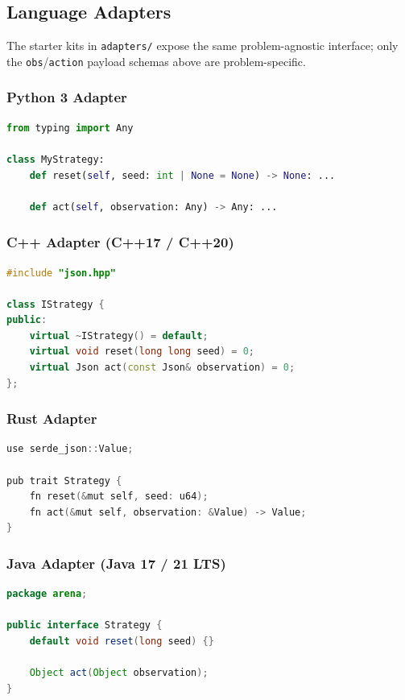 \documentclass[11pt,a4paper]{article}
\begin{document}
\subsection{Language Adapters}

The starter kits in \texttt{adapters/} expose the same problem-agnostic
interface; only the \texttt{obs}/\texttt{action} payload schemas above are
problem-specific.

\subsubsection{Python 3 Adapter}
\begin{lstlisting}[language=Python]
from typing import Any

class MyStrategy:
    def reset(self, seed: int | None = None) -> None: ...

    def act(self, observation: Any) -> Any: ...
\end{lstlisting}

\subsubsection{C++ Adapter (C++17 / C++20)}
\begin{lstlisting}[language=C++]
#include "json.hpp"

class IStrategy {
public:
    virtual ~IStrategy() = default;
    virtual void reset(long long seed) = 0;
    virtual Json act(const Json& observation) = 0;
};
\end{lstlisting}

\subsubsection{Rust Adapter}
\begin{lstlisting}[language=C++]
use serde_json::Value;

pub trait Strategy {
    fn reset(&mut self, seed: u64);
    fn act(&mut self, observation: &Value) -> Value;
}
\end{lstlisting}

\subsubsection{Java Adapter (Java 17 / 21 LTS)}
\begin{lstlisting}[language=Java]
package arena;

public interface Strategy {
    default void reset(long seed) {}

    Object act(Object observation);
}
\end{lstlisting}
\end{document}
